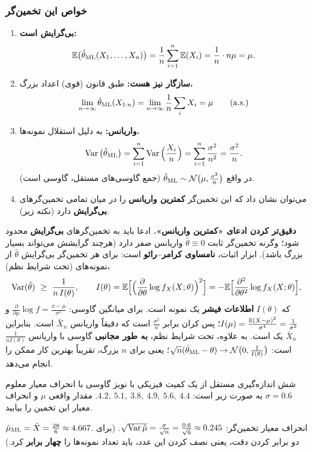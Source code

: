 \subsubsection{خواص این تخمین‌گر}
\begin{enumerate}
\item \textbf{بی‌گرایش  است:}
\[
\mathbb{E}\big(\hat\theta_{\mathrm{ML}}(X_1,\ldots,X_n)\big)=\frac1n\sum_{i=1}^n\mathbb{E}(X_i)=\frac1n\cdot n\mu=\mu .
\]
\item \textbf{سازگار  نیز هست:} طبق قانون (قوی) اعداد بزرگ،
\[
\lim_{n\to\infty}\hat\theta_{\mathrm{ML}}(X_{1:n})=\lim_{n\to\infty}\frac1n\sum_iX_i=\mu\qquad(\mathrm{a.s.})
\]
\item \textbf{واریانس:} به دلیل استقلال نمونه‌ها،
\[
\operatorname{Var}\big(\hat\theta_{\mathrm{ML}}\big)=\sum_{i=1}^n\operatorname{Var}\Big(\frac{X_i}{n}\Big)=\sum_{i=1}^n\frac{\sigma^2}{n^2}=\frac{\sigma^2}{n}.
\]
در واقع $\hat\theta_{\mathrm{ML}}\sim\mathcal N\big(\mu,\frac{\sigma^2}{n}\big)$ (جمع گاوسی‌های مستقل، گاوسی است).
\item می‌توان نشان داد که این تخمین‌گر \textbf{کمترین واریانس} را در میان تمامی تخمین‌گرهای \textbf{بی‌گرایش} دارد (نکته زیر).
\end{enumerate}

\begin{note}
\notetitle \textbf{دقیق‌تر کردن ادعای «کمترین واریانس».} ادعا باید به تخمین‌گرهای \textbf{بی‌گرایش} محدود شود؛ وگرنه تخمین‌گر ثابت $\hat\theta\equiv0$ واریانس صفر دارد (هرچند گرایشش می‌تواند بسیار بزرگ باشد). ابزار اثبات، \textbf{نامساوی کرامر--رائو} است: برای هر تخمین‌گر بی‌گرایش $\hat\theta$ از نمونه‌های  (تحت شرایط نظم)،
\[
\Var(\hat\theta)\ \ge\ \frac{1}{n\,I(\theta)},\qquad
I(\theta)=\E\Big[\Big(\frac{\partial}{\partial\theta}\log f_X(X;\theta)\Big)^2\Big]=-\E\Big[\frac{\partial^2}{\partial\theta^2}\log f_X(X;\theta)\Big],
\]
که $I(\theta)$ \textbf{اطلاعات فیشر}  یک نمونه است. برای میانگین گاوسی: $\frac{\partial}{\partial\mu}\log f=\frac{x-\mu}{\sigma^2}$ و $I(\mu)=\frac{\mathbb{E}(X-\mu)^2}{\sigma^4}=\frac1{\sigma^2}$؛ پس کران برابر $\frac{\sigma^2}{n}$ است که دقیقاً واریانس $\bar X_n$ است. بنابراین $\bar X_n$ یک  است. به علاوه، تحت شرایط نظم،  \textbf{به طور مجانبی} گاوسی با واریانس $\frac{1}{nI(\theta)}$ است: $\sqrt n(\hat\theta_{\mathrm{ML}}-\theta)\to\mathcal N\big(0,\frac{1}{I(\theta)}\big)$؛ یعنی برای $n$ بزرگ،  تقریباً بهترین کار ممکن را انجام می‌دهد.
\end{note}

\begin{example}
شش اندازه‌گیری مستقل از یک کمیت فیزیکی با نویز گاوسی با انحراف معیار معلوم $\sigma=0.6$ به صورت زیر است:
$4.2,\ 5.1,\ 3.8,\ 4.9,\ 5.6,\ 4.4$.
 مقدار واقعی $\mu$ و انحراف معیار این تخمین را بیابید.
\begin{solution}
$\hat\mu_{\mathrm{ML}}=\bar X=\frac{28}{6}\approx4.667$. انحراف معیار تخمین‌گر: $\sqrt{\operatorname{Var}\hat\mu}=\frac{\sigma}{\sqrt n}=\frac{0.6}{\sqrt6}\approx0.245$. (برای دو برابر کردن دقت، یعنی نصف کردن این عدد، باید تعداد نمونه‌ها را \textbf{چهار برابر} کرد.)
\end{solution}
\end{example}

